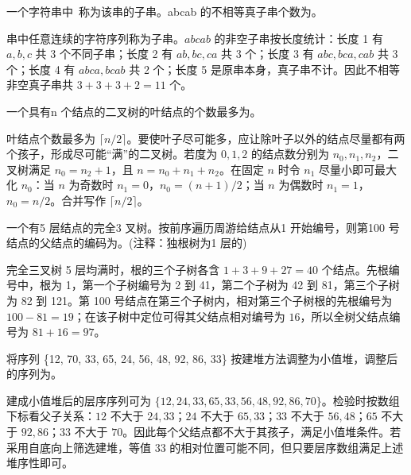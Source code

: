 \begin{question}
一个字符串中\blank\ 称为该串的子串。abcab 的不相等真子串个数为\blank。
\begin{solution}
串中任意连续的字符序列称为子串。$abcab$ 的非空子串按长度统计：长度 1 有 $a,b,c$ 共 3 个不同子串；长度 2 有 $ab,bc,ca$ 共 3 个；长度 3 有 $abc,bca,cab$ 共 3 个；长度 4 有 $abca,bcab$ 共 2 个；长度 5 是原串本身，真子串不计。因此不相等非空真子串共 $3+3+3+2=11$ 个。
\end{solution}
\end{question}

\begin{question}
一个具有n 个结点的二叉树的叶结点的个数最多为\blank。
\begin{solution}
叶结点个数最多为 $\lceil n/2\rceil$。要使叶子尽可能多，应让除叶子以外的结点尽量都有两个孩子，形成尽可能“满”的二叉树。若度为 $0,1,2$ 的结点数分别为 $n_0,n_1,n_2$，二叉树满足 $n_0=n_2+1$，且 $n=n_0+n_1+n_2$。在固定 $n$ 时令 $n_1$ 尽量小即可最大化 $n_0$：当 $n$ 为奇数时 $n_1=0$，$n_0=(n+1)/2$；当 $n$ 为偶数时 $n_1=1$，$n_0=n/2$。合并写作 $\lceil n/2\rceil$。
\end{solution}
\end{question}

\begin{question}
一个有5 层结点的完全3 叉树。按前序遍历周游给结点从1 开始编号，则第100 号结点的父结点的编码为\blank。(注释：独根树为1 层的)
\begin{solution}
完全三叉树 5 层均满时，根的三个子树各含 $1+3+9+27=40$ 个结点。先根编号中，根为 1，第一个子树编号为 2 到 41，第二个子树为 42 到 81，第三个子树为 82 到 121。第 100 号结点在第三个子树内，相对第三个子树根的先根编号为 $100-81=19$；在该子树中定位可得其父结点相对编号为 $16$，所以全树父结点编号为 $81+16=97$。
\end{solution}
\end{question}

\begin{question}
将序列 \{12, 70, 33, 65, 24, 56, 48, 92, 86, 33\} 按建堆方法调整为小值堆，调整后的序列为\blank。
\begin{solution}
建成小值堆后的层序序列可为 $\{12,24,33,65,33,56,48,92,86,70\}$。检验时按数组下标看父子关系：$12$ 不大于 $24,33$；$24$ 不大于 $65,33$；$33$ 不大于 $56,48$；$65$ 不大于 $92,86$；$33$ 不大于 $70$。因此每个父结点都不大于其孩子，满足小值堆条件。若采用自底向上筛选建堆，等值 $33$ 的相对位置可能不同，但只要层序数组满足上述堆序性即可。
\end{solution}
\end{question}

